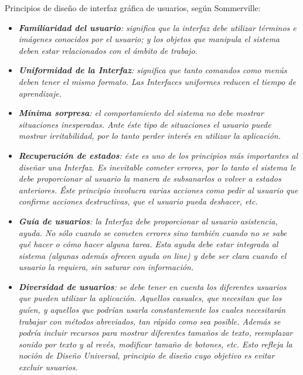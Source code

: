 \documentclass[11pt,oneside]{book}
\begin{document}
Principios de diseño de interfaz gráfica de usuarios, según Sommerville:
\begin{itemize}
\item \textit{\textbf{Familiaridad del usuario}: significa que la interfaz debe utilizar términos e imágenes conocidos por el usuario; y los objetos que manipula el sistema deben estar relacionados con el ámbito de trabajo.}

\item \textit{\textbf{Uniformidad de la Interfaz}: significa que tanto comandos como menús deben tener el mismo formato. Las Interfaces uniformes reducen el tiempo de aprendizaje.}

\item \textit{\textbf{Mínima sorpresa}: el comportamiento del sistema no debe mostrar situaciones inesperadas. Ante éste tipo de situaciones el usuario puede mostrar irritabilidad, por lo tanto perder interés en utilizar la aplicación.}

\item \textit{\textbf{Recuperación de estados}: éste es uno de los principios más importantes al diseñar una Interfaz. Es inevitable cometer errores, por lo tanto el sistema le debe proporcionar al usuario la manera de subsanarlos o volver a estados anteriores. Éste principio involucra varias acciones como pedir al usuario que confirme acciones destructivas, que el usuario pueda deshacer, etc.}
 
\item \textit{\textbf{Guía de usuarios}: la Interfaz debe proporcionar al usuario asistencia, ayuda. No sólo cuando se cometen errores sino también cuando no se sabe qué hacer o cómo hacer alguna tarea. Esta ayuda debe estar integrada al sistema (algunas además ofrecen ayuda on line) y debe ser clara cuando el usuario la requiera, sin saturar con información.}
 
\item \textit{\textbf{Diversidad de usuarios}: se debe tener en cuenta los diferentes usuarios que pueden utilizar la aplicación. Aquellos casuales, que necesitan que los guíen, y aquellos que podrían usarla constantemente los cuales necesitarán trabajar con métodos abreviados, tan rápido como sea posible. Además se podría incluir recursos para mostrar diferentes tamaños de texto, reemplazar sonido por texto y al revés, modificar tamaño de botones, etc. Esto refleja la noción de Diseño Universal, principio de diseño cuyo objetivo es evitar excluir usuarios.}
\end{itemize}
\end{document}
